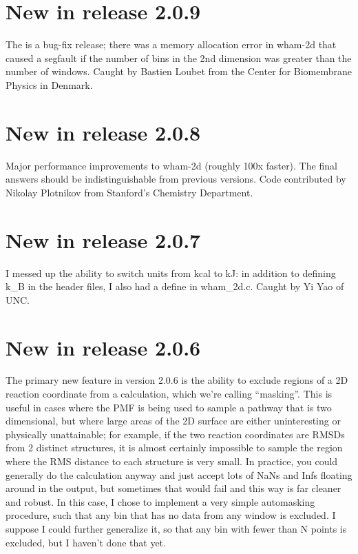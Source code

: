 \documentclass[12pt]{article}
\begin{document}
\section{New in release 2.0.9}

The is a bug-fix release; there was a memory allocation error in wham-2d
that caused a segfault if the number of bins in the 2nd dimension was
greater than the number of windows.  Caught by Bastien Loubet from the
Center for Biomembrane Physics in Denmark.

\section{New in release 2.0.8}

Major performance improvements to wham-2d (roughly 100x faster).  The final
answers should be indistinguishable from previous versions.  Code
contributed by Nikolay Plotnikov from Stanford's Chemistry Department.

\section{New in release 2.0.7}

I messed up the ability to switch units from kcal to kJ: in addition to
defining k\_B in the header files, I also had a define in wham\_2d.c.  Caught
by Yi Yao of UNC.

\section{New in release 2.0.6}

The primary new feature in version 2.0.6 is the ability to exclude regions
of a 2D reaction coordinate from a calculation, which we're calling
``masking''.  This is useful in cases where the PMF is being used to sample a
pathway that is two dimensional, but where large areas of the 2D surface are
either uninteresting or physically unattainable; for example, if the two
reaction coordinates are RMSDs from 2 distinct structures, it is almost
certainly impossible to sample the region where the RMS distance to each
structure is very small.  In practice, you could generally do the calculation
anyway and just accept lots of NaNs and Infs floating around in the output,
but sometimes that would fail and this way is far cleaner and robust.  In
this case, I chose to implement a very simple automasking procedure, such
that any bin that has no data from any window is excluded.  I suppose I could
further generalize it, so that any bin with fewer than N points is excluded,
but I haven't done that yet.
\end{document}
